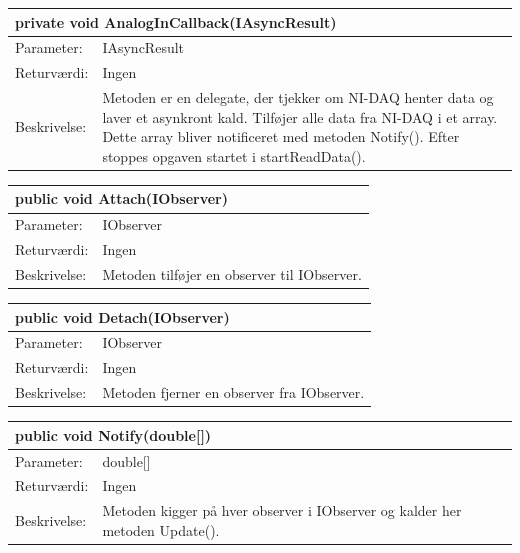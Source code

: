 \begin{table}[H]
\label{tab:tabel2}
\begin{tabular}{| l | p{13cm} |}
   \hline
   \multicolumn{2}{|l|}{private void AnalogInCallback(IAsyncResult)} \\ \hline
   Parameter: & IAsyncResult \\ \hline
   Returværdi: & Ingen\\ \hline
   Beskrivelse: & Metoden er en delegate, der tjekker om NI-DAQ henter data og laver et asynkront kald. Tilføjer alle data fra NI-DAQ i et array. Dette array bliver notificeret med metoden Notify(). Efter stoppes opgaven startet i startReadData().\\ \hline
\end{tabular}
\end{table}
\begin{table}[H]
\label{tab:tabel2}
\begin{tabular}{| l | p{13cm} |}
   \hline
   \multicolumn{2}{|l|}{public void Attach(IObserver)} \\ \hline
   Parameter: & IObserver \\ \hline
   Returværdi: & Ingen\\ \hline
   Beskrivelse: & Metoden tilføjer en observer til IObserver.\\ \hline
\end{tabular}
\end{table}
\begin{table}[H]
\label{tab:tabel2}
\begin{tabular}{| l | p{13cm} |}
   \hline
   \multicolumn{2}{|l|}{public void Detach(IObserver)} \\ \hline
   Parameter: & IObserver \\ \hline
   Returværdi: & Ingen\\ \hline
   Beskrivelse: & Metoden fjerner en observer fra IObserver.\\ \hline
\end{tabular}
\end{table}
\begin{table}[H]
\label{tab:tabel2}
\begin{tabular}{| l | p{13cm} |}
   \hline
   \multicolumn{2}{|l|}{public void Notify(double[])} \\ \hline
   Parameter: & double[] \\ \hline
   Returværdi: & Ingen\\ \hline
   Beskrivelse: & Metoden kigger på hver observer i IObserver og kalder her metoden Update().\\ \hline
\end{tabular}
\end{table}


